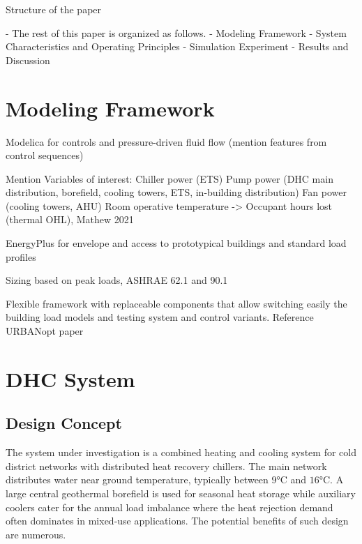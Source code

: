 Structure of the paper

- The rest of this paper is organized as follows.
- Modeling Framework
- System Characteristics and Operating Principles
- Simulation Experiment
- Results and Discussion


\section{Modeling Framework} \label{sec:modeling}

Modelica for controls and pressure-driven fluid flow (mention features from control sequences)

Mention Variables of interest:
Chiller power (ETS)
Pump power (DHC main distribution, borefield, cooling towers, ETS, in-building distribution)
Fan power (cooling towers, AHU)
Room operative temperature -> Occupant hours lost (thermal OHL), Mathew 2021

EnergyPlus for envelope and access to prototypical buildings and standard load profiles

Sizing based on peak loads, ASHRAE 62.1 and 90.1

Flexible framework with replaceable components that allow switching easily the building load models and testing system and control variants.
Reference URBANopt paper

\section{DHC System} \label{sec:dhc}

\subsection{Design Concept} \label{sec:concept}

The system under investigation is a combined heating and cooling system for cold district networks with distributed heat recovery chillers. The main network distributes water near ground temperature, typically between $9$°C and $16$°C. A large central geothermal borefield is used for seasonal heat storage while auxiliary coolers cater for the annual load imbalance where the heat rejection demand often dominates in mixed-use applications.
The potential benefits of such design are numerous.

